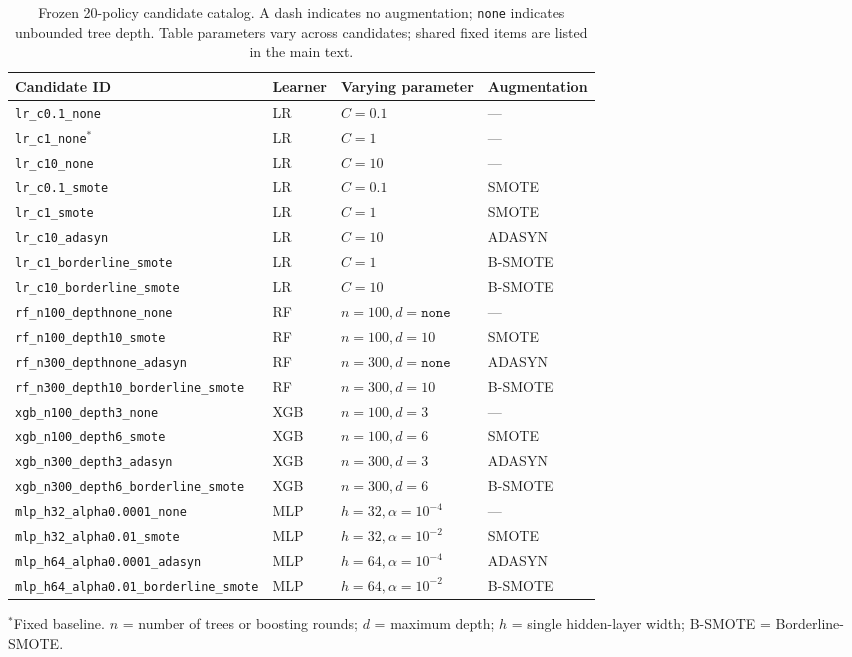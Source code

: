 \documentclass[referee]{USG}
\begin{document}
\begin{table}[t]
\caption{Frozen 20-policy candidate catalog. A dash indicates no augmentation; \texttt{none} indicates unbounded tree depth. Table parameters vary across candidates; shared fixed items are listed in the main text.}
\label{tab:catalog}
\centering\fontsize{8pt}{9.5pt}\selectfont
\setlength{\tabcolsep}{3pt}
\begin{tabularx}{\textwidth}{@{}>{\raggedright\arraybackslash}p{50mm}l>{\raggedright\arraybackslash}Xl@{}}
\toprule
Candidate ID & Learner & Varying parameter & Augmentation\\
\midrule
\nolinkurl{lr_c0.1_none} & LR & $C=0.1$ & ---\\
\nolinkurl{lr_c1_none}$^{*}$ & LR & $C=1$ & ---\\
\nolinkurl{lr_c10_none} & LR & $C=10$ & ---\\
\nolinkurl{lr_c0.1_smote} & LR & $C=0.1$ & SMOTE\\
\nolinkurl{lr_c1_smote} & LR & $C=1$ & SMOTE\\
\nolinkurl{lr_c10_adasyn} & LR & $C=10$ & ADASYN\\
\nolinkurl{lr_c1_borderline_smote} & LR & $C=1$ & B-SMOTE\\
\nolinkurl{lr_c10_borderline_smote} & LR & $C=10$ & B-SMOTE\\
\nolinkurl{rf_n100_depthnone_none} & RF & $n=100,d=\texttt{none}$ & ---\\
\nolinkurl{rf_n100_depth10_smote} & RF & $n=100,d=10$ & SMOTE\\
\nolinkurl{rf_n300_depthnone_adasyn} & RF & $n=300,d=\texttt{none}$ & ADASYN\\
\nolinkurl{rf_n300_depth10_borderline_smote} & RF & $n=300,d=10$ & B-SMOTE\\
\nolinkurl{xgb_n100_depth3_none} & XGB & $n=100,d=3$ & ---\\
\nolinkurl{xgb_n100_depth6_smote} & XGB & $n=100,d=6$ & SMOTE\\
\nolinkurl{xgb_n300_depth3_adasyn} & XGB & $n=300,d=3$ & ADASYN\\
\nolinkurl{xgb_n300_depth6_borderline_smote} & XGB & $n=300,d=6$ & B-SMOTE\\
\nolinkurl{mlp_h32_alpha0.0001_none} & MLP & $h=32,\alpha=10^{-4}$ & ---\\
\nolinkurl{mlp_h32_alpha0.01_smote} & MLP & $h=32,\alpha=10^{-2}$ & SMOTE\\
\nolinkurl{mlp_h64_alpha0.0001_adasyn} & MLP & $h=64,\alpha=10^{-4}$ & ADASYN\\
\nolinkurl{mlp_h64_alpha0.01_borderline_smote} & MLP & $h=64,\alpha=10^{-2}$ & B-SMOTE\\
\bottomrule
\end{tabularx}
\vspace{1mm}
\parbox{0.97\textwidth}{\raggedright $^{*}$Fixed baseline. $n$ = number of trees or boosting rounds; $d$ = maximum depth; $h$ = single hidden-layer width; B-SMOTE = Borderline-SMOTE.}
\end{table}
\end{document}
